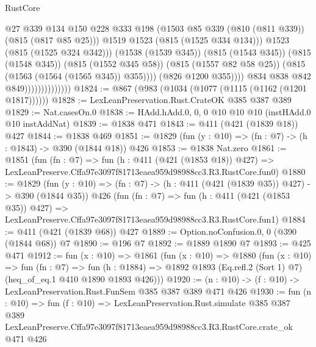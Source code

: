 \begin{lexlean}{RustCore}
\begin{coremodule}
                                              @27
                                              @339
                                              @134
                                              @150
                                              @228
                                              @333
                                              @198
                                              (@1503
                                                @85
                                                @339
                                                (@810 (@811 @339))
                                                (@815 (@817 @85 @25)))
                                              @1519
                                              @1523
                                              (@815 (@1525 @334 @134)))
                                            @1523
                                            (@815 (@1525 @324 @342)))
                                          (@1538 (@1539 @345))
                                          (@815 (@1543 @345))
                                          (@815 (@1548 @345))
                                          (@815 (@1552 @345 @58))
                                          (@815 (@1557 @82 @58 @25))
                                          (@815 (@1563 (@1564 (@1565 @345)) @355))))
                                      (@826 @1200 @355))))
                                @834
                                @838
                                @842
                                @849))))))))))))))
@1824 := @867 (@983 (@1034 (@1077 (@1115 (@1162 (@1201 @1817))))))
@1828 := LexLeanPreservation.Rust.CrateOK @385 @387 @389
@1829 := Nat.casesOn.{0}
@1838 := HAdd.hAdd.{0, 0, 0} @10 @10 @10 (instHAdd.{0} @10 instAddNat)
@1839 := @1838 @471
@1843 := @411 (@421 (@1839 @18)) @427
@1844 := @1838 @469
@1851 := @1829 (fun (y : @10) => (fn : @7) -> (h : @1843) -> @390 (@1844 @18)) @426
@1853 := @1838 Nat.zero
@1861 := @1851
    (fun (fn : @7) =>
    fun (h : @411 (@421 (@1853 @18)) @427) =>
    LexLeanPreserve.Cffa97e3097f81713eaea959d98988cc3.R3.RustCore.fun0)
@1880 := @1829
    (fun (y : @10) => (fn : @7) -> (h : @411 (@421 (@1839 @35)) @427) -> @390 (@1844 @35))
    @426
    (fun (fn : @7) =>
    fun (h : @411 (@421 (@1853 @35)) @427) =>
    LexLeanPreserve.Cffa97e3097f81713eaea959d98988cc3.R3.RustCore.fun1)
@1884 := @411 (@421 (@1839 @68)) @427
@1889 := Option.noConfusion.{0, 0} (@390 (@1844 @68)) @7
@1890 := @196 @7
@1892 := @1889 @1890 @7
@1893 := @425 @471
@1912 := fun (x : @10) =>
  @1861
    (fun (x : @10) =>
    @1880
      (fun (x : @10) =>
      fun (fn : @7) =>
      fun (h : @1884) =>
      @1892 @1893 (Eq.refl.{2} (Sort 1) @7) (heq_of_eq.{1} @410 @1890 @1893 @426)))
@1920 := (n : @10) -> (f : @10) -> LexLeanPreservation.Rust.FunSem @385 @387 @389 @471 @426
@1930 := fun (n : @10) =>
  fun (f : @10) =>
  LexLeanPreservation.Rust.simulate
    @385
    @387
    @389
    LexLeanPreserve.Cffa97e3097f81713eaea959d98988cc3.R3.RustCore.crate_ok
    @471
    @426
\end{coremodule}
\end{lexlean}
